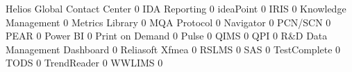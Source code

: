 \documentclass{article}
\begin{document}
\begin{Schunk}
\begin{Soutput}
  Helios Global Contact Center                                                           0
  IDA Reporting                                                                          0
  ideaPoint                                                                              0
  IRIS                                                                                   0
  Knowledge Management                                                                   0
  Metrics Library                                                                        0
  MQA Protocol                                                                           0
  Navigator                                                                              0
  PCN/SCN                                                                                0
  PEAR                                                                                   0
  Power BI                                                                               0
  Print on Demand                                                                        0
  Pulse                                                                                  0
  QIMS                                                                                   0
  QPI                                                                                    0
  R&D Data Management Dashboard                                                          0
  Reliasoft Xfmea                                                                        0
  RSLMS                                                                                  0
  SAS                                                                                    0
  TestComplete                                                                           0
  TODS                                                                                   0
  TrendReader                                                                            0
  WWLIMS                                                                                 0
                                                           

\end{Soutput}
\end{Schunk}
\end{document}
